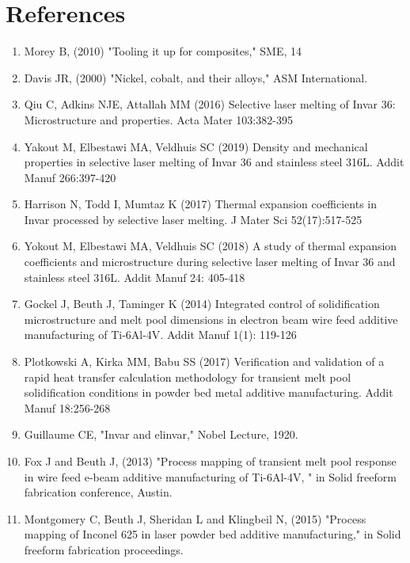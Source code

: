 \documentclass[10pt]{article}
\begin{document}
\section*{References}
\begin{enumerate}
  \item Morey B, (2010) "Tooling it up for composites," SME, 14

  \item Davis JR, (2000) "Nickel, cobalt, and their alloys," ASM International.

  \item Qiu C, Adkins NJE, Attallah MM (2016) Selective laser melting of Invar 36: Microstructure and properties. Acta Mater 103:382-395

  \item Yakout M, Elbestawi MA, Veldhuis SC (2019) Density and mechanical properties in selective laser melting of Invar 36 and stainless steel 316L. Addit Manuf 266:397-420

  \item Harrison N, Todd I, Mumtaz K (2017) Thermal expansion coefficients in Invar processed by selective laser melting. J Mater Sci 52(17):517-525

  \item Yokout M, Elbestawi MA, Veldhuis SC (2018) A study of thermal expansion coefficients and microstructure during selective laser melting of Invar 36 and stainless steel 316L. Addit Manuf 24: 405-418

  \item Gockel J, Beuth J, Taminger K (2014) Integrated control of solidification microstructure and melt pool dimensions in electron beam wire feed additive manufacturing of Ti-6Al-4V. Addit Manuf 1(1): 119-126

  \item Plotkowski A, Kirka MM, Babu SS (2017) Verification and validation of a rapid heat transfer calculation methodology for transient melt pool solidification conditions in powder bed metal additive manufacturing. Addit Manuf 18:256-268

  \item Guillaume CE, "Invar and elinvar," Nobel Lecture, 1920.

  \item Fox J and Beuth J, (2013) "Process mapping of transient melt pool response in wire feed e-beam additive manufacturing of Ti-6Al-4V, " in Solid freeform fabrication conference, Austin.

  \item Montgomery C, Beuth J, Sheridan L and Klingbeil N, (2015) "Process mapping of Inconel 625 in laser powder bed additive manufacturing," in Solid freeform fabrication proceedings.


\end{enumerate}
\end{document}
